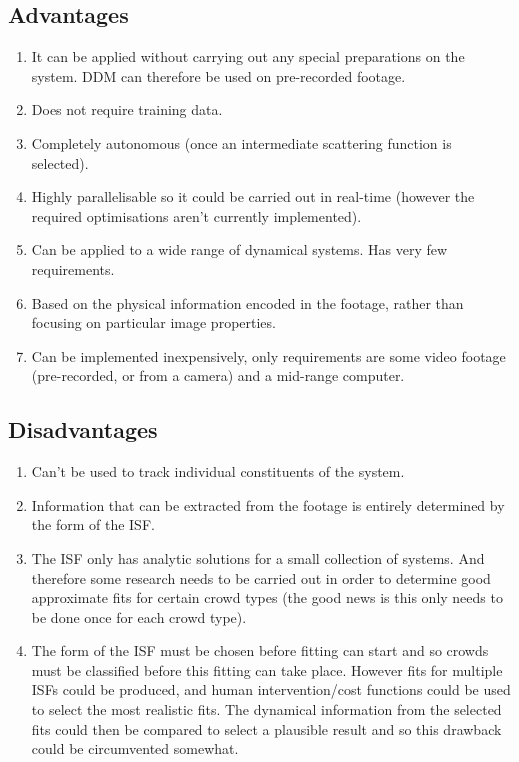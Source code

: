 \documentclass[11pt]{article}
\begin{document}
\subsection{Advantages}
\begin{enumerate}
\item It can be applied without carrying out any special preparations on the system. DDM can therefore be used on pre-recorded footage.
\item Does not require training data.
\item Completely autonomous (once an intermediate scattering function is selected).
\item Highly parallelisable so it could be carried out in real-time (however the required optimisations aren't currently implemented).
\item Can be applied to a wide range of dynamical systems. Has very few requirements.
\item Based on the physical information encoded in the footage, rather than focusing on particular image properties.
\item Can be implemented inexpensively, only requirements are some video footage (pre-recorded, or from a camera) and a mid-range computer.
\end{enumerate}

\subsection{Disadvantages}
\begin{enumerate}
\item Can't be used to track individual constituents of the system.
\item Information that can be extracted from the footage is entirely determined by the form of the ISF.
\item The ISF only has analytic solutions for a small collection of systems. And therefore some research needs to be carried out in order to determine good approximate fits for certain crowd types (the good news is this only needs to be done once for each crowd type).
\item The form of the ISF must be chosen before fitting can start and so crowds must be classified before this fitting can take place. However fits for multiple ISFs could be produced, and human intervention/cost functions could be used to select the most realistic fits. The dynamical information from the selected fits could then be compared to select a plausible result and so this drawback could be circumvented somewhat.
\end{enumerate}
\end{document}
